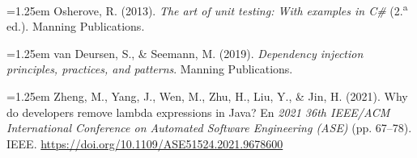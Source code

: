 \smallskip
\noindent\hangindent=1.25em Osherove, R. (2013). \textit{The art of unit testing: With examples in C\#} (2.\textsuperscript{a} ed.). Manning Publications.

\smallskip
\noindent\hangindent=1.25em van Deursen, S., \& Seemann, M. (2019). \textit{Dependency injection principles, practices, and patterns}. Manning Publications.

\smallskip
\noindent\hangindent=1.25em Zheng, M., Yang, J., Wen, M., Zhu, H., Liu, Y., \& Jin, H. (2021). Why do developers remove lambda expressions in Java? En \textit{2021 36th IEEE/ACM International Conference on Automated Software Engineering (ASE)} (pp. 67--78). IEEE. \url{https://doi.org/10.1109/ASE51524.2021.9678600}

\endgroup
